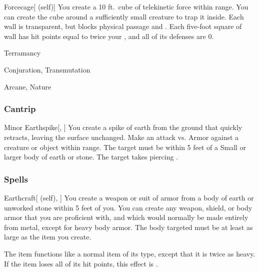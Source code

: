 \lowercase{\hypertarget{spell:Forcecage}{}}\label{spell:Forcecage}
\begin{attuneability}[\nth{7}]{\hypertarget{spell:Forcecage}{Forcecage}}[ (self)]
You create a 10 ft.\ cube of telekinetic force within \rngmed range.
You can create the cube around a sufficiently small creature to trap it inside.
Each wall is transparent, but blocks physical passage and .
Each five-foot square of wall has hit points equal to twice your , and all of its defenses are 0.
\end{attuneability}
\vspace{0.25em}


\newpage
\begin{spellsection}{Terramancy}

\begin{spellheader}
\end{spellheader}


 Conjuration, Transmutation

 Arcane, Nature

\subsubsection{Cantrip}


\begin{freeability}{Minor Earthspike}[, ]
You create a spike of earth from the ground that quickly retracts, leaving the surface unchanged.
Make an attack vs. Armor against a creature or object within \rngmed range.
The target must be within 5 feet of a Small or larger body of earth or stone.
\hit The target takes piercing .
\end{freeability}

\end{spellsection}


\subsubsection{Spells}


\lowercase{\hypertarget{spell:Earthcraft}{}}\label{spell:Earthcraft}
\begin{attuneability}[\nth{1}]{\hypertarget{spell:Earthcraft}{Earthcraft}}[ (self), ]
You create a weapon or suit of armor from a body of earth or unworked stone within 5 feet of you.
You can create any weapon, shield, or body armor that you are proficient with, and which would normally be made entirely from metal, except for heavy body armor.
The body targeted must be at least as large as the item you create.

The item functions like a normal item of its type, except that it is twice as heavy.
If the item loses all of its hit points, this effect is .
\end{attuneability}
\vspace{0.25em}



